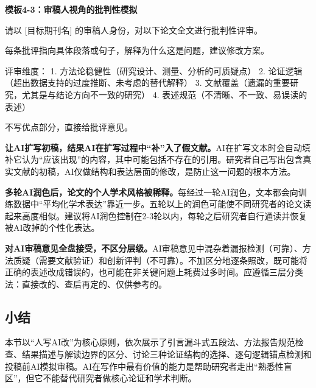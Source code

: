 \textbf{模板4-3：审稿人视角的批判性模拟}

\begin{tcolorbox}[promptbox]
请以 [目标期刊名] 的审稿人身份，对以下论文全文进行批判性评审。

每条批评指向具体段落或句子，解释为什么这是问题，建议修改方案。

评审维度：
1. 方法论稳健性（研究设计、测量、分析的可质疑点）
2. 论证逻辑（超出数据支持的过度推断、未考虑的替代解释）
3. 文献覆盖（遗漏的重要研究，尤其是与结论方向不一致的研究）
4. 表述规范（不清晰、不一致、易误读的表述）

不写优点部分，直接给批评意见。
\end{tcolorbox}



\begin{mistakebox}

\textbf{让AI扩写初稿，结果AI在扩写过程中``补''入了假文献。}AI在扩写文本时会自动填补它认为``应该出现''的内容，其中可能包括不存在的引用。研究者自己写出包含真实文献的初稿，AI仅做结构和表达层面的修改，是防止这一问题的根本方法。

\smallskip

\textbf{多轮AI润色后，论文的个人学术风格被稀释。}每经过一轮AI润色，文本都会向训练数据中``平均化学术表达''靠近一步。五轮以上的润色可能使不同研究者的论文读起来高度相似。建议将AI润色控制在2-3轮以内，每轮之后研究者自行通读并恢复被AI改掉的个性化表达。

\smallskip

\textbf{对AI审稿意见全盘接受，不区分层级。}AI审稿意见中混杂着漏报检测（可靠）、方法质疑（需要文献验证）和创新评判（不可靠）。不加区分地逐条照改，既可能将正确的表述改成错误的，也可能在非关键问题上耗费过多时间。应遵循三层分类法：直接改的、查后再定的、仅供参考的。

\end{mistakebox}

\subsection*{小结}
本节以``人写AI改''为核心原则，依次展示了引言漏斗式五段法、方法报告规范检查、结果描述与解读边界的区分、讨论三种论证结构的选择、逐句逻辑锚点检测和投稿前AI模拟审稿。AI在写作中最有价值的能力是帮助研究者走出``熟悉性盲区''，但它不能替代研究者做核心论证和学术判断。

\bigskip
